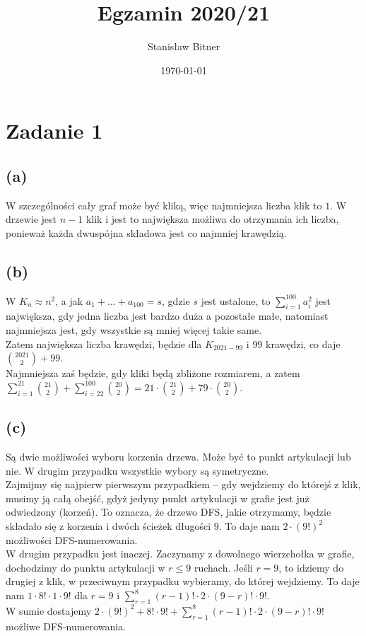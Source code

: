 \documentclass[12pt, a4paper]{article}
\title{Egzamin 2020/21}
\author{Stanisław Bitner}
\date{\today}
\begin{document}
\maketitle

\section*{Zadanie 1}
\subsection*{(a)}
W szczególności cały graf może być kliką, więc najmniejsza liczba klik to $1$.
W drzewie jest $n-1$ klik i jest to największa możliwa do otrzymania ich
liczba, ponieważ każda dwuspójna składowa jest co najmniej krawędzią.

\subsection*{(b)}
W $K_n \approx n^2$, a jak $a_1 + ... + a_{100} = s$, gdzie $s$ jest ustalone,
to $\sum_{i=1}^{100} a_i^2$ jest największa, gdy jedna liczba jest bardzo duża
a pozostałe małe, natomiast najmniejsza jest, gdy wszystkie są mniej więcej
takie same.\\ Zatem największa liczba krawędzi, będzie dla $K_{2021-99}$ i $99$
krawędzi, co daje $\binom{2021}{2} + 99$.\\ Najmniejsza zaś będzie, gdy kliki
będą zbliżone rozmiarem, a zatem\\ $\sum_{i=1}^{21} \binom{21}{2}
+ \sum_{i=22}^{100} \binom{20}{2} = 21\cdot \binom{21}{2} + 79 \cdot
\binom{20}{2}$.

\subsection*{(c)}
Są dwie możliwości wyboru korzenia drzewa. Może być to punkt artykulacji lub
nie. W drugim przypadku wszystkie wybory są symetryczne.\\ Zajmijmy się
najpierw pierwszym przypadkiem -- gdy wejdziemy do którejś z klik, musimy ją
całą obejść, gdyż jedyny punkt artykulacji w grafie jest już odwiedzony
(korzeń). To oznacza, że drzewo DFS, jakie otrzymamy, będzie składało się
z korzenia i dwóch ścieżek długości $9$. To daje nam $2 \cdot (9!)^2$
możliwości DFS-numerowania.\\ W drugim przypadku jest inaczej. Zaczynamy
z dowolnego wierzchołka w grafie, dochodzimy do punktu artykulacji w $r \le 9$
ruchach. Jeśli $r=9$, to idziemy do drugiej z klik, w przeciwnym przypadku
wybieramy, do której wejdziemy. To daje nam $1 \cdot 8! \cdot 1 \cdot 9!$ dla
$r=9$ i $\sum_{r=1}^8 (r-1)! \cdot 2 \cdot (9 - r)! \cdot 9!$.\\ W sumie
dostajemy $2 \cdot (9!)^2 + 8! \cdot 9! + \sum_{r=1}^8 (r-1)! \cdot 2 \cdot (9
- r)! \cdot 9!$ możliwe DFS-numerowania.
\end{document}

